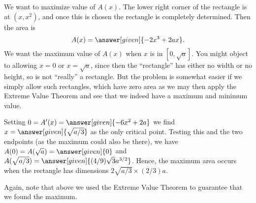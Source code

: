 \documentclass{ximera}
\begin{document}
\begin{example}
\begin{image}
\end{image}
\begin{explanation}
We want to maximize value of $A(x)$.  The lower right corner of the
rectangle is at $(x,x^2)$, and once this is chosen the rectangle is
completely determined. Then the area is
\[
A(x)=\answer[given]{-2x^3+2ax}.
\] 
We want the maximum value of $A(x)$ when $x$ is in $[0,\sqrt{a}]$. You
might object to allowing $x=0$ or $x=\sqrt{a}$, since then the
``rectangle'' has either no width or no height, so is not ``really'' a
rectangle. But the problem is somewhat easier if we simply allow such
rectangles, which have zero area as we may then apply the Extreme
Value Theorem and see that we indeed have a maximum and minimum value.

Setting $0=A'(x)=\answer[given]{-6x^2+2a}$ we find
$x=\answer[given]{\sqrt{a/3}}$ as the only critical point. Testing
this and the two endpoints (as the maximum could also be there), we
have $A(0)=A(\sqrt{a})=\answer[given]{0}$ and
$A(\sqrt{a/3})=\answer[given]{(4/9)\sqrt{3}a^{3/2}}$. Hence, the maximum area
occurs when the rectangle has dimensions $2\sqrt{a/3}\times (2/3)a$.
\end{explanation}
\end{example}

Again, note that above we used the Extreme Value Theorem to guarantee
that we found the maximum.
\end{document}
